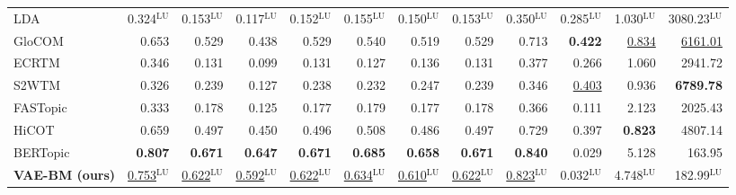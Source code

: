 \begin{table}[t]
{\begin{tabular}{lrrrrrrrrrrr}
LDA & 0.324$^{\mathrm{LU}}$ & 0.153$^{\mathrm{LU}}$ & 0.117$^{\mathrm{LU}}$ & 0.152$^{\mathrm{LU}}$ & 0.155$^{\mathrm{LU}}$ & 0.150$^{\mathrm{LU}}$ & 0.153$^{\mathrm{LU}}$ & 0.350$^{\mathrm{LU}}$ & 0.285$^{\mathrm{LU}}$ & 1.030$^{\mathrm{LU}}$ & 3080.23$^{\mathrm{LU}}$ \\
GloCOM & 0.653 & 0.529 & 0.438 & 0.529 & 0.540 & 0.519 & 0.529 & 0.713 & \textbf{0.422} & \underline{0.834} & \underline{6161.01} \\
ECRTM & 0.346 & 0.131 & 0.099 & 0.131 & 0.127 & 0.136 & 0.131 & 0.377 & 0.266 & 1.060 & 2941.72 \\
S2WTM & 0.326 & 0.239 & 0.127 & 0.238 & 0.232 & 0.247 & 0.239 & 0.346 & \underline{0.403} & 0.936 & \textbf{6789.78} \\
FASTopic & 0.333 & 0.178 & 0.125 & 0.177 & 0.179 & 0.177 & 0.178 & 0.366 & 0.111 & 2.123 & 2025.43 \\
HiCOT & 0.659 & 0.497 & 0.450 & 0.496 & 0.508 & 0.486 & 0.497 & 0.729 & 0.397 & \textbf{0.823} & 4807.14 \\
BERTopic & \textbf{0.807} & \textbf{0.671} & \textbf{0.647} & \textbf{0.671} & \textbf{0.685} & \textbf{0.658} & \textbf{0.671} & \textbf{0.840} & 0.029 & 5.128 & 163.95 \\
\midrule
\textbf{VAE-BM (ours)} & \underline{0.753}$^{\mathrm{LU}}$ & \underline{0.622}$^{\mathrm{LU}}$ & \underline{0.592}$^{\mathrm{LU}}$ & \underline{0.622}$^{\mathrm{LU}}$ & \underline{0.634}$^{\mathrm{LU}}$ & \underline{0.610}$^{\mathrm{LU}}$ & \underline{0.622}$^{\mathrm{LU}}$ & \underline{0.823}$^{\mathrm{LU}}$ & 0.032$^{\mathrm{LU}}$ & 4.748$^{\mathrm{LU}}$ & 182.99$^{\mathrm{LU}}$ \\
\bottomrule
\end{tabular}
}
\end{table}
